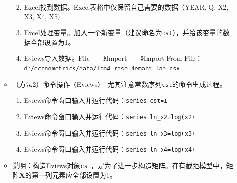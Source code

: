 \documentclass[12pt,(landscape,a4paper),(portrait,a4paper)]{article}
\providecommand{\tightlist}{%
  \setlength{\itemsep}{0pt}\setlength{\parskip}{0pt}}
\begin{document}
\begin{itemize}
\begin{itemize}
    \begin{enumerate}
    \def\labelenumi{\alph{enumi}.}
    \tightlist
    \item
      Excel找到数据。Excel表格中仅保留自己需要的数据（YEAR, Q, X2, X3,
      X4, X5）
    \item
      Excel处理变量。加入一个新变量（建议命名为\texttt{cst}），并给该变量的数据全部设置为1。
    \item
      Eviews导入数据。File------》Import------》Import From
      File：\texttt{d:/econometrics/data/lab4-rose-demand-lab.csv}
    \end{enumerate}
  \item
    （方法2）命令操作（Eviews）：尤其注意常数序列\texttt{cst}的命令生成过程。

    \begin{enumerate}
    \def\labelenumi{\alph{enumi}.}
    \tightlist
    \item
      Eviews命令窗口输入并运行代码：\texttt{series\ cst=1}
    \item
      Eviews命令窗口输入并运行代码：\texttt{series\ ln\_x2=log(x2)}
    \item
      Eviews命令窗口输入并运行代码：\texttt{series\ ln\_x3=log(x3)}
    \item
      Eviews命令窗口输入并运行代码：\texttt{series\ ln\_x4=log(x4)}
    \end{enumerate}
  \item
    说明：构造Eviews对象\texttt{cst}，是为了进一步构造矩阵。在有截距模型中，矩阵\(\mathbf{X}\)的第一列元素应全部设置为1。
  \end{itemize}

  \begin{figure}


\end{figure}
\end{itemize}
\end{document}
